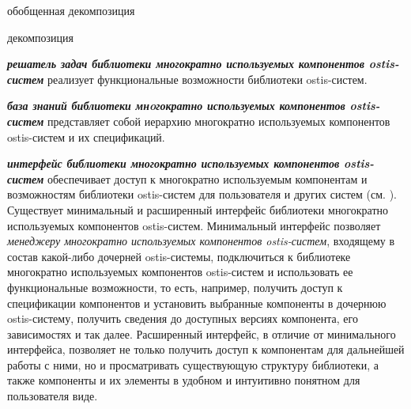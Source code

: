\begin{SCn}
	\begin{scnrelfromset}{обобщенная декомпозиция}
		\begin{scnindent}
			\begin{scnrelfromset}{декомпозиция}
				\begin{scnindent}
				\end{scnindent}
			\end{scnrelfromset}
		\end{scnindent}
	\end{scnrelfromset}
\end{SCn}

\textit{\textbf{решатель задач библиотеки многократно используемых компонентов ostis-систем}} реализует функциональные возможности библиотеки ostis-систем.

\textit{\textbf{база знаний библиотеки мнoгократно используемых компонентов ostis-систем}} представляет собой иерархию многократно используемых компонентов ostis-систем и их спецификаций.

\textit{\textbf{интерфейс библиотеки многократно используемых компонентов ostis-систем}} обеспечивает доступ к многократно используемым компонентам и возможностям библиотеки ostis-систем для пользователя и других систем (см. ). Существует минимальный и расширенный интерфейс библиотеки многократно используемых компонентов ostis-систем. Минимальный интерфейс позволяет \textit{менеджеру многократно используемых компонентов ostis-систем}, входящему в состав какой-либо дочерней ostis-системы, подключиться к библиотеке многократно используемых компонентов ostis-систем и использовать ее функциональные возможности, то есть, например, получить доступ к спецификации компонентов и установить выбранные компоненты в дочернюю ostis-систему, получить сведения до доступных версиях компонента, его зависимостях и так далее. Расширенный интерфейс, в отличие от минимального интерфейса, позволяет не только получить доступ к компонентам для дальнейшей работы с ними, но и просматривать существующую структуру библиотеки, а также компоненты и их элементы в удобном и интуитивно понятном для пользователя виде.

